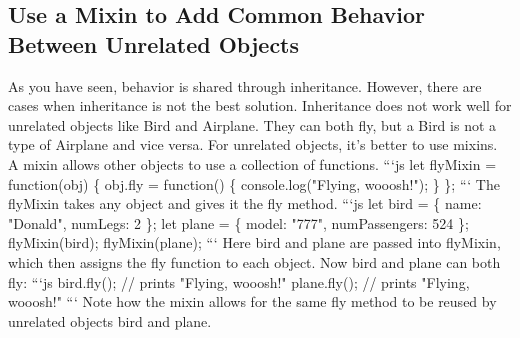 \documentclass{article}%
\begin{document}
%
\subsection{Use a Mixin to Add Common Behavior Between Unrelated Objects}%
\label{subsec:UseaMixintoAddCommonBehaviorBetweenUnrelatedObjects}%
As you have seen, behavior is shared through inheritance. However, there are cases when inheritance is not the best solution. Inheritance does not work well for unrelated objects like Bird and Airplane. They can both fly, but a Bird is not a type of Airplane and vice versa.\newline%
For unrelated objects, it's better to use mixins. A mixin allows other objects to use a collection of functions.\newline%
```js\newline%
let flyMixin = function(obj) \{\newline%
  obj.fly = function() \{\newline%
    console.log("Flying, wooosh!");\newline%
  \}\newline%
\};\newline%
```\newline%
The flyMixin takes any object and gives it the fly method.\newline%
```js\newline%
let bird = \{\newline%
  name: "Donald",\newline%
  numLegs: 2\newline%
\};\newline%
let plane = \{\newline%
  model: "777",\newline%
  numPassengers: 524\newline%
\};\newline%
flyMixin(bird);\newline%
flyMixin(plane);\newline%
```\newline%
Here bird and plane are passed into flyMixin, which then assigns the fly function to each object. Now bird and plane can both fly:\newline%
```js\newline%
bird.fly(); // prints "Flying, wooosh!"\newline%
plane.fly(); // prints "Flying, wooosh!"\newline%
```\newline%
Note how the mixin allows for the same fly method to be reused by unrelated objects bird and plane.\newline%
\end{document}
